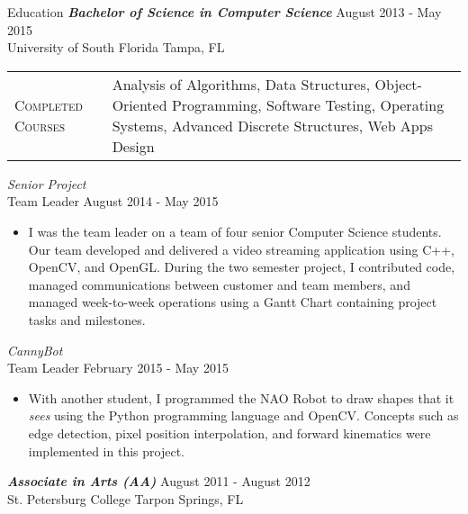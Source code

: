 \begin{section}{Education}
  {\sl \textbf{Bachelor of Science in Computer Science}} \hfill August 2013 - May 2015 \\
  University of South Florida \hfill Tampa, FL \\
  \begin{tabularx}{\linewidth}{@{}l X@{}}
    \textsc{Completed Courses} &\small{Analysis of Algorithms, Data Structures, Object-Oriented Programming, Software Testing, Operating Systems, Advanced Discrete Structures, Web Apps Design}\\
  \end{tabularx}
  {\sl Senior Project} \\ Team Leader \hfill August 2014 - May 2015
  \begin{itemize}
    \item I was the team leader on a team of four senior Computer Science students. Our team developed and delivered a video streaming application using C++, OpenCV, and OpenGL. During the two semester project, I contributed code, managed communications between customer and team members, and managed week-to-week operations using a Gantt Chart containing project tasks and milestones.
  \end{itemize}
  {\sl CannyBot} \\ Team Leader \hfill February 2015 - May 2015
  \begin{itemize}
    \item With another student, I programmed the NAO Robot to draw shapes that it \textit{sees} using the Python programming language and OpenCV. Concepts such as edge detection, pixel position interpolation, and forward kinematics were implemented in this project.
  \end{itemize}

  {\sl \textbf{Associate in Arts (AA)}} \hfill August 2011 - August 2012 \\
  St. Petersburg College \hfill Tarpon Springs, FL \\
\end{section}
